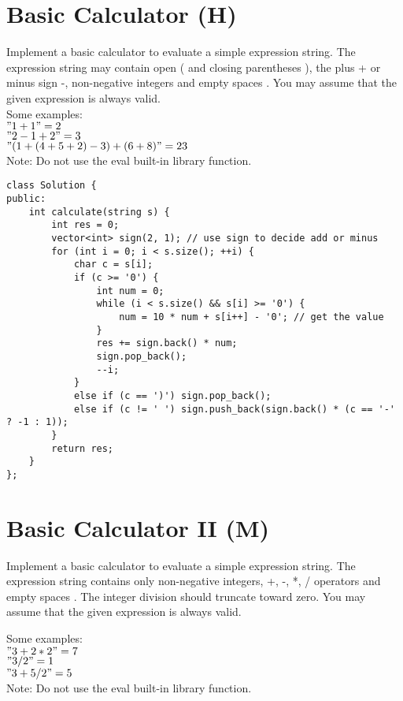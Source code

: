 \section{Basic Calculator (H)}
Implement a basic calculator to evaluate a simple expression string. The expression string may contain open ( and closing parentheses ), the plus + or minus sign -, non-negative integers and empty spaces . You may assume that the given expression is always valid.\\

Some examples:\\
$"1 + 1" = 2$\\
$" 2-1 + 2 " = 3$\\
$"(1+(4+5+2)-3)+(6+8)" = 23$\\

Note: Do not use the eval built-in library function. \\

\begin{lstlisting}
class Solution {
public:
    int calculate(string s) {
        int res = 0;
        vector<int> sign(2, 1); // use sign to decide add or minus
        for (int i = 0; i < s.size(); ++i) {
            char c = s[i];
            if (c >= '0') {
                int num = 0;
                while (i < s.size() && s[i] >= '0') {
                    num = 10 * num + s[i++] - '0'; // get the value
                }
                res += sign.back() * num;
                sign.pop_back();
                --i;
            }
            else if (c == ')') sign.pop_back();
            else if (c != ' ') sign.push_back(sign.back() * (c == '-' ? -1 : 1));
        }
        return res;
    }
};
\end{lstlisting}


\section{Basic Calculator II (M)}
Implement a basic calculator to evaluate a simple expression string. The expression string contains only non-negative integers, +, -, *, / operators and empty spaces . The integer division should truncate toward zero. You may assume that the given expression is always valid.

Some examples:\\
$"3+2*2" = 7$\\
$" 3/2 " = 1$\\
$" 3+5 / 2 " = 5$\\

Note: Do not use the eval built-in library function. \\

